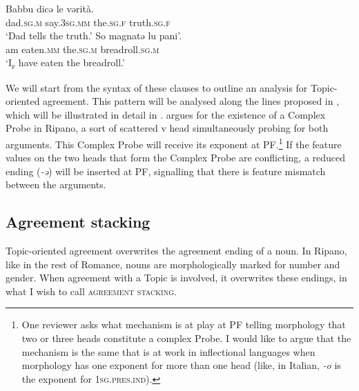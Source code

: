 \documentclass[output=paper
,modfonts
,nonflat]{langsci/langscibook}
\begin{document}
\begin{exe} 
	\ex \label{ex-dalessandro:31}\citet[107]{Mancini1988/1997} \xlist
	\ex 
	\gll Babbu   dicə   le   vərità.\\
	dad.\textsc{sg.m}   say.\textsc{3sg.mm} the.\textsc{sg.f}   truth.\textsc{sg.f}\\
	\glt`Dad tells the truth.'
	\ex
	\gll So   magnatə   lu     pani’.\\
	am   eaten.\textsc{mm}   the.\textsc{sg.m}   breadroll.\textsc{sg.m}\\ 
	\glt `I\textsc{\textsubscript{f}} have eaten the breadroll.'
	\endxlist
\end{exe}
We will start from the syntax of these clauses to outline an analysis for Topic-oriented agreement. This pattern will be analysed along the lines proposed in \citet{D`Alessandro2017}, which will be illustrated in detail in . \citet{D`Alessandro2017} argues for the existence of a Complex Probe in Ripano, a sort of scattered v head simultaneously probing for both arguments. This Complex Probe will receive its exponent at PF.\footnote{One reviewer asks what mechanism is at play at PF telling morphology that two or three heads constitute a complex Probe. I would like to argue that the mechanism is the same that is at work in inflectional languages when morphology has one exponent for more than one head (like, in Italian, \textit{-o} is the exponent for \textsc{1sg.pres.ind}).} If the feature values on the two heads that form the Complex Probe are conflicting, a reduced ending (\textit{-ə}) will be inserted at PF, signalling that there is feature mismatch between the arguments.  
\subsection{Agreement stacking} \label{sec-dalessandro:4.5}
Topic-oriented agreement overwrites the agreement ending of a noun. In Ripano, like in the rest of Romance, nouns are morphologically marked for number and gender. When agreement with a Topic is involved, it overwrites these endings, in what I wish to call \textsc{agreement stacking}.
\end{document}
